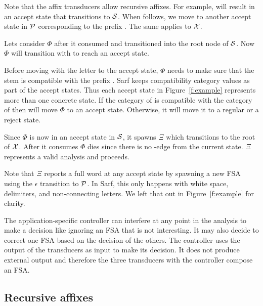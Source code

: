 \documentclass[11pt]{article}
\newcommand{\noTrRL}[1]{\transfalse\RL{#1}\transtrue}
\newcommand{\noTrnoVocRL}[1]{\transfalse\novocalize\noTrRL{#1}\vocalize\transtrue}
\begin{document}
Note that the affix transducers allow recursive 
affixes. 
For example, \noTrnoVocRL{w} will result in an accept state
that transitions to ${\cal S}$.
When \noTrnoVocRL{s} follows, we move to another accept state in 
${\cal P}$ corresponding to the prefix \noTrnoVocRL{ws}. 
The same applies to ${\cal X}$. 

Lets consider $\Phi$ after it consumed \noTrnoVocRL{wsy} 
and transitioned into the root node of ${\cal S}$.
Now $\Phi$ will transition with \noTrnoVocRL{l`b} to reach an accept 
state. 

Before moving with the letter \noTrnoVocRL{b} to the accept state,
$\Phi$ needs to make sure that the stem \noTrnoVocRL{l`b} is compatible
with the prefix \noTrnoVocRL{wsy}. 
Sarf keeps compatibility category values as part
of the accept states. 
Thus each accept state in Figure~\ref{f:example} represents
more than one concrete state. 
If the category of \noTrnoVocRL{l`b} is compatible with the category of
\noTrnoVocRL{wsy} then \noTrnoVocRL{b} will move $\Phi$ to an accept state. 
Otherwise, it will move it to a regular or a reject state. 
       
Since $\Phi$ is now in an accept state in ${\cal S}$, it 
spawns $\Xi$ which transitions to the root of ${\cal X}$. 
After it consumes \noTrnoVocRL{h--} $\Phi$ dies since there is no
\noTrnoVocRL{h--}-edge from the current state.
$\Xi$ represents a valid analysis and proceeds.
       
Note that $\Xi$ reports a full word at any accept state
by spawning a new FSA using the $\epsilon$ transition
to ${\cal P}$.
In Sarf, this only happens with white space, delimiters, 
and non-connecting letters. 
We left that out in Figure~\ref{f:example} for clarity. 
       
The application-specific controller can interfere at any point in the 
analysis to make a decision like ignoring an FSA that 
is not interesting. 
It may also decide to correct one FSA
based on the decision of the others. 
The controller uses the output of the transducers as input
to make its decision. 
It does not produce external output and therefore 
the three transducers with the 
controller compose an FSA.

\subsection{Recursive affixes}
\label{sec:recaffix}
\end{document}
